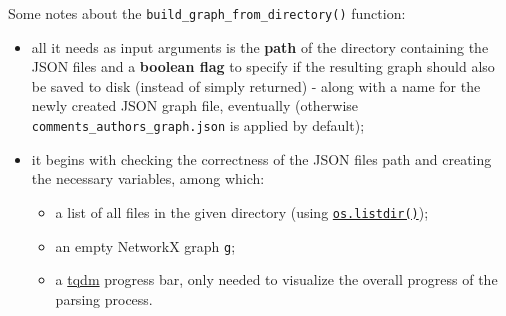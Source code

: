 \documentclass[11pt]{article}
\begin{document}
Some notes about the \texttt{build\_graph\_from\_directory()} function:

\begin{itemize}
    \item all it needs as input arguments is the \textbf{path} of the directory
containing the JSON files and a \textbf{boolean flag} to specify if the
resulting graph should also be saved to disk (instead of simply
returned) - along with a name for the newly created JSON graph file,
eventually (otherwise \texttt{comments\_authors\_graph.json} is applied
by default); \item it begins with checking the correctness of the JSON files
path and creating the necessary variables, among which:

\begin{itemize}
\item a list of all
files in the given directory (using
\href{https://docs.python.org/3/library/os.html\#os.listdir}{\texttt{os.listdir()}});
\item an empty NetworkX graph \texttt{g}; \item a
\href{https://tqdm.github.io/}{tqdm} progress bar, only needed to
visualize the overall progress of the parsing process.
\end{itemize}
\end{itemize}
\end{document}
